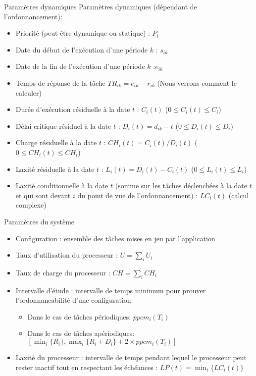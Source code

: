 \begin{frame}{Paramètres dynamiques}
  Paramètres dynamiques (dépendant de l'ordonnancement):
  \begin{itemize} 
  \item Priorité (peut être dynamique ou statique) : $P_i$
  \item Date du début de l'exécution d'une période $k$ : $s_{ik}$
  \item Date de la fin de l'exécution d'une période $k$ :$e_{ik}$
  \item Temps de réponse de la tâche $TR_{ik} = e_{ik} - r_{ik}$ (Nous
    verrons comment le calculer)
  \item Durée d'exécution résiduelle à la date $t$ : $C_i(t)$ ($0 ≤
    C_i(t) ≤ C_i$)
  \item Délai  critique résiduel à la  date $t$ :  $D_i(t) = d_{ik}-t$
    ($0 ≤ D_i(t) ≤ D_i$)
  \item Charge résiduelle à la date $t$ :
    $CH_i(t) = C_i(t) / D_i(t)$  ($0 ≤ CH_i(t) ≤ CH_i$)
  \item Laxité  résiduelle à la  date $t$ :
    $L_i(t) = D_i(t) - C_i(t)$  ($0  ≤ L_i(t) ≤  L_i$)
  \item  Laxité conditionnelle  à la  date $t$  (somme sur  les tâches
    déclenchées à la  date $t$ et qui sont devant $i$  du point de vue
    de  l'ordonnancement)  :  $LC_i(t)$ (calcul complexe)
  \end{itemize} 
\end{frame}


\begin{frame}{Paramètres du système}
  \begin{itemize} 
  \item  Configuration  :  ensemble   des  tâches  mises  en  jeu  par
    l'application
  \item Taux d'utilisation du processeur : $U = \sum_i U_i$
  \item Taux de charge du processeur : $CH = \sum_i CH_i$
  \item Intervalle d'étude :  intervalle de temps minimum pour prouver
    l'ordonnancabilité  d'une  configuration
    \begin{itemize} 
    \item  Dans  le  cas de  tâches périodiques: $ppcm_i(T_i)$
    \item  Dans le cas  de tâches  apériodiques: $\left[\min_i\{R_i\},
        \max_i\{R_i + D_i\} + 2 \times ppcm_i(T_i)\right]$
    \end{itemize} 
  \item Laxité du  processeur : intervalle de temps  pendant lequel le
    processeur peut rester inactif  tout en respectant les échéances :
    $ LP(t) = \min_i\{LC_i(t)\}$
  \end{itemize} 
\end{frame} 

